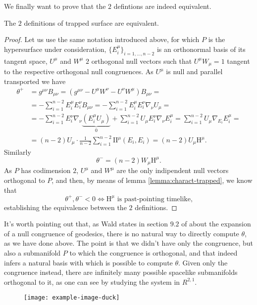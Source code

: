 We finally want to prove that the \(2\) defintions are indeed equivalent.
\begin{lemma}
	\label{lemma:equiv-trapped}
	The \(2\) definitions of trapped surface are equivalent.
\end{lemma}
\begin{proof}
	Let us use the same notation introduced above, for which \(P\) is the hypersurface under consideration, \(\{E_i^{\mu}\}_{i = 1, \ldots, n - 2}\) is an orthonormal basis of its tangent space, \(U^{\mu}\) and \(W^{\mu}\) \(2\) orthogonal null vectors such that \(U^{\mu}W_{\mu} = 1\) tangent to the respective orthogonal null congruences. As \(U^{\mu}\) is null and parallel transported we have
	\begin{align*}
		\theta^+ &= g^{\mu\nu}B_{\mu\nu} = \left(g^{\mu\nu} - U^{\mu}W^{\nu} - U^{\nu}W^{\mu}\right)B_{\mu\nu} =\\
		&= - \sum_{i=1}^{n - 2}E_i^{\mu}E_i^{\nu}B_{\mu\nu} = - \sum_{i=1}^{n - 2}E_i^{\mu}E_i^{\nu}\nabla_{\nu}U_{\mu} = \\
		& = -  \sum_{i=1}^{n - 2}E_i^{\nu}\nabla_{\nu}\underbrace{\left(E_i^{\mu}U_{\mu}\right)}_{0} +  \sum_{i=1}^{n - 2}U_{\mu}E_i^{\nu}\nabla_{\nu}E_i^{\mu} = \sum_{i=1}^{n - 2}U_{\mu}\nabla_{E_i}E_i^{\mu} = \\
		& = (n - 2) U_{\mu} \cdot \frac{1}{n - 2}\sum_{i=1}^{n - 2}\mathrm{I\!I}^{\mu} \left(E_i, E_i\right) = (n - 2) U_{\mu}\mathrm{H}^{\mu}.
	\end{align*}
	Similarly
	\[
	\theta^- = (n - 2) W_{\mu}\mathrm{H}^{\mu}.
	\]
	As \(P\) has codimension \(2\), \(U^{\mu}\) and \(W^{\mu}\) are the only indipendent null vectors orthogonal to \(P\), and then, by means of lemma \ref{lemma:charact-trapped}, we know that 
	\[
	\theta^+ , \theta^- < 0 \iff \mathrm{H}^{\mu} \text{ is past-pointing timelike,}
	\]
	establishing the equivalence between the \(2\) definitions.
\end{proof}

\begin{remark}
	It's worth pointing out that, as Wald states in section \(9.2\) of \cite{wald2010general} about the expansion of a null congruence of geodesics, there is no natural way to directly compute \(\theta\), as we have done above. The point is that we didn't have only the congruence, but also a submanifold \(P\) to which the congruence is orthogonal, and that indeed infers a natural basis with which is possible to compute \(\theta\). Given only the congruence instead, there are infinitely many possible spacelike submanifolds orthogonal to it, as one can see by studying the system in \(R^{2,1}\).
	\begin{figure}[!h]
		\centering
		\texttt{[image: example-image-duck]}
	\end{figure}
\end{remark}


